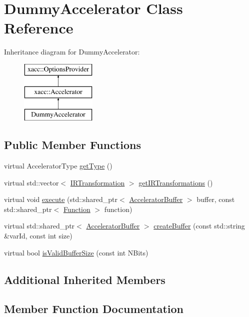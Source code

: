 \hypertarget{a01143}{}\section{Dummy\+Accelerator Class Reference}
\label{a01143}
Inheritance diagram for Dummy\+Accelerator\+:\begin{figure}[H]
\begin{center}
\leavevmode
\includegraphics[height=3.000000cm]{a01143}
\end{center}
\end{figure}
\subsection*{Public Member Functions}
\begin{DoxyCompactItemize}
\item 
virtual Accelerator\+Type \hyperlink{a01143_acdfe3e856f2bacc9e0dc1a51782a52e3}{get\+Type} ()
\item 
virtual std\+::vector$<$ \hyperlink{a01503}{I\+R\+Transformation} $>$ \hyperlink{a01143_aac0e2ae753064701468fa1188ac7549f}{get\+I\+R\+Transformations} ()
\item 
virtual void \hyperlink{a01143_a389ba22af5d0d964f5d5367f01712b3c}{execute} (std\+::shared\+\_\+ptr$<$ \hyperlink{a01447}{Accelerator\+Buffer} $>$ buffer, const std\+::shared\+\_\+ptr$<$ \hyperlink{a01475}{Function} $>$ function)
\item 
virtual std\+::shared\+\_\+ptr$<$ \hyperlink{a01447}{Accelerator\+Buffer} $>$ \hyperlink{a01143_aa645e7ba6343aa9812836d1e141bd7c8}{create\+Buffer} (const std\+::string \&var\+Id, const int size)
\item 
virtual bool \hyperlink{a01143_a831ad0c71864920cc49a00d29768af8c}{is\+Valid\+Buffer\+Size} (const int N\+Bits)
\end{DoxyCompactItemize}
\subsection*{Additional Inherited Members}


\subsection{Member Function Documentation}
\mbox{\label{a01143_aa645e7ba6343aa9812836d1e141bd7c8}} 
